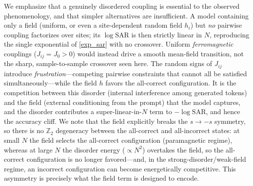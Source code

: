 \documentclass{article}
\theoremstyle{plain}
\begin{document}
We emphasize that a genuinely disordered coupling is essential to the observed phenomenology, and that simpler alternatives are insufficient. A model containing only a field (uniform, or even a site-dependent random field $h_i$) but \emph{no} pairwise coupling factorizes over sites; its $\log\mathrm{SAR}$ is then strictly linear in $N$, reproducing the single exponential of \cref{exp_sar} with no crossover. Uniform \emph{ferromagnetic} couplings ($J_{ij}=J_0>0$) would instead drive a smooth mean-field transition, not the sharp, sample-to-sample crossover seen here. The random signs of $J_{ij}$ introduce \emph{frustration}---competing pairwise constraints that cannot all be satisfied simultaneously---while the field $h$ favors the all-correct configuration. It is the competition between this disorder (internal interference among generated tokens) and the field (external conditioning from the prompt) that the model captures, and the disorder contributes a super-linear-in-$N$ term to $-\log\mathrm{SAR}$, and hence the accuracy cliff. We note that the field explicitly breaks the $s\to-s$ symmetry, so there is no $\mathbb{Z}_2$ degeneracy between the all-correct and all-incorrect states: at small $N$ the field selects the all-correct configuration (paramagnetic regime), whereas at large $N$ the disorder energy ($\propto N^2$) overtakes the field, so the all-correct configuration is no longer favored---and, in the strong-disorder/weak-field regime, an incorrect configuration can become energetically competitive. This asymmetry is precisely what the field term is designed to encode.
\end{document}
